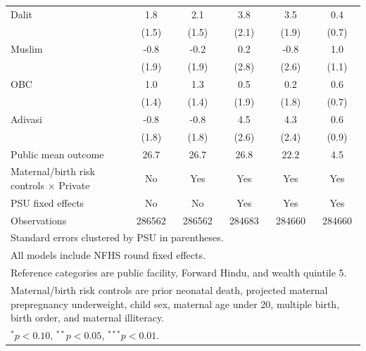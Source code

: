 {\begin{tabular}{l*{5}{c}}
\addlinespace
Dalit       &         1.8         &         2.1         &         3.8\sym{*}  &         3.5\sym{*}  &         0.4         \\
            &       (1.5)         &       (1.5)         &       (2.1)         &       (1.9)         &       (0.7)         \\
\addlinespace
Muslim      &        -0.8         &        -0.2         &         0.2         &        -0.8         &         1.0         \\
            &       (1.9)         &       (1.9)         &       (2.8)         &       (2.6)         &       (1.1)         \\
\addlinespace
OBC         &         1.0         &         1.3         &         0.5         &         0.2         &         0.6         \\
            &       (1.4)         &       (1.4)         &       (1.9)         &       (1.8)         &       (0.7)         \\
\addlinespace
Adivasi     &        -0.8         &        -0.8         &         4.5\sym{*}  &         4.3\sym{*}  &         0.6         \\
            &       (1.8)         &       (1.8)         &       (2.6)         &       (2.4)         &       (0.9)         \\
\midrule
Public mean outcome&        26.7         &        26.7         &        26.8         &        22.2         &         4.5         \\
Maternal/birth risk controls $\times$ Private&          No         &         Yes         &         Yes         &         Yes         &         Yes         \\
PSU fixed effects&          No         &          No         &         Yes         &         Yes         &         Yes         \\
Observations&      286562         &      286562         &      284683         &      284660         &      284660         \\
\bottomrule
\multicolumn{6}{l}{\footnotesize Standard errors clustered by PSU in parentheses.}\\
\multicolumn{6}{l}{\footnotesize All models include NFHS round fixed effects.}\\
\multicolumn{6}{l}{\footnotesize Reference categories are public facility, Forward Hindu, and wealth quintile 5.}\\
\multicolumn{6}{l}{\footnotesize Maternal/birth risk controls are prior neonatal death, projected maternal prepregnancy underweight, child sex, maternal age under 20, multiple birth, birth order, and maternal illiteracy.}\\
\multicolumn{6}{l}{\footnotesize $^{*}p<0.10$, $^{**}p<0.05$, $^{***}p<0.01$.}\\
\end{tabular}
}

